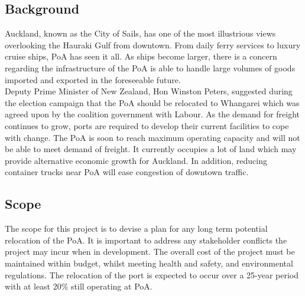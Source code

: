 % 

\newpage
{}
\vspace*{-40mm} %
\vspace{-2mm}

\subsection*{Background}
Auckland, known as the City of Sails, has one of the most illustrious views overlooking the Hauraki Gulf from downtown. From daily ferry services to luxury cruise ships, PoA has seen it all. As ships become larger, there is a concern regarding the infrastructure of the PoA is able to handle large volumes of goods imported and exported in the foreseeable future.
\\ Deputy Prime Minister of New Zealand, Hon Winston Peters, suggested during the election campaign that the PoA should be relocated to Whangarei which was agreed upon by the coalition government with Labour. As the demand for freight continues to grow, ports are required to develop their current facilities to cope with change. The PoA is soon to reach maximum operating capacity and will not be able to meet demand of freight. It currently occupies a lot of land which may provide alternative economic growth for Auckland. In addition, reducing container trucks near PoA will ease congestion of downtown traffic. 

\subsection*{Scope}
The scope for this project is to devise a plan for any long term potential relocation of the PoA. It is important to address any stakeholder conflicts the project may incur when in development. The overall cost of the project must be maintained within budget, whilst meeting health and safety, and environmental regulations. The relocation of the port is expected to occur over a 25-year period with at least 20\% still operating at PoA.

